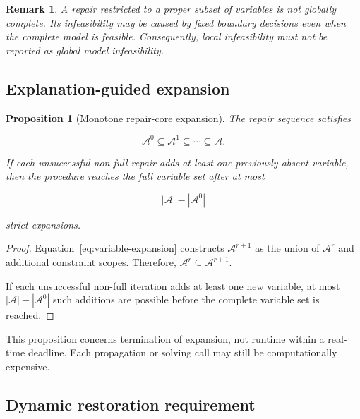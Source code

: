 \documentclass[pdflatex,sn-mathphys-num,iicol,oneside]{sn-jnl}
\newtheorem{proposition}{Proposition}
\newtheorem{remark}{Remark}
\begin{document}
\begin{remark}
A repair restricted to a proper subset of variables is not globally
complete. Its infeasibility may be caused by fixed boundary decisions
even when the complete model is feasible. Consequently, local
infeasibility must not be reported as global model infeasibility.
\end{remark}

\subsection{Explanation-guided expansion}

\begin{proposition}[Monotone repair-core expansion]
The repair sequence satisfies

\begin{equation}
\mathcal{A}^{0}
\subseteq
\mathcal{A}^{1}
\subseteq
\cdots
\subseteq
\mathcal{A}.
\end{equation}

If each unsuccessful non-full repair adds at least one previously
absent variable, then the procedure reaches the full variable set
after at most

\begin{equation}
|\mathcal{A}|-|\mathcal{A}^{0}|
\end{equation}

strict expansions.
\end{proposition}

\begin{proof}
Equation~\eqref{eq:variable-expansion} constructs
$\mathcal{A}^{r+1}$ as the union of $\mathcal{A}^{r}$ and additional
constraint scopes. Therefore,
$\mathcal{A}^{r}\subseteq\mathcal{A}^{r+1}$.

If each unsuccessful non-full iteration adds at least one new
variable, at most
$|\mathcal{A}|-|\mathcal{A}^{0}|$ such additions are possible before
the complete variable set is reached.
\end{proof}

This proposition concerns termination of expansion, not runtime
within a real-time deadline. Each propagation or solving call may
still be computationally expensive.

\subsection{Dynamic restoration requirement}
\end{document}
